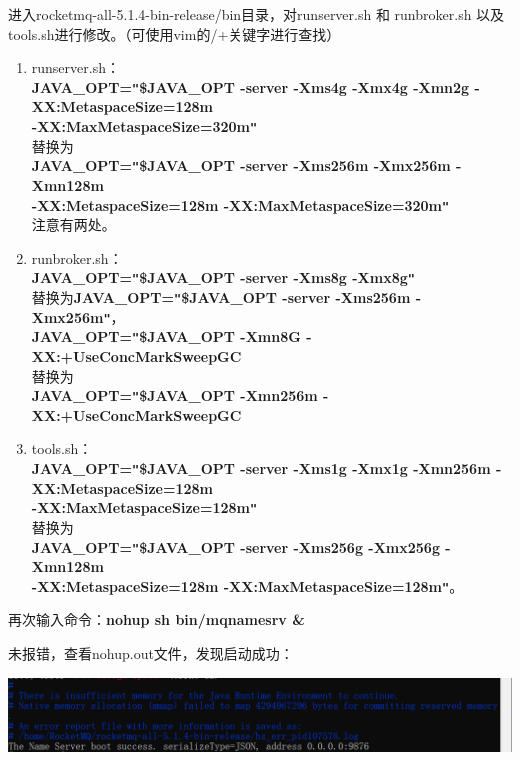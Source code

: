\documentclass[11pt, a4paper, oneside]{ctexbook}
\let\kaishu\relax                               %
\begin{document}
进入rocketmq-all-5.1.4-bin-release/bin目录，对runserver.sh 和 runbroker.sh 以及 tools.sh进行修改。（可使用vim的/+关键字进行查找）
\begin{enumerate}
  \item runserver.sh：
  \\{\bfseries\kaishu JAVA\_OPT=\texttt{"}\${JAVA\_OPT} -server -Xms4g -Xmx4g -Xmn2g -XX:MetaspaceSize=128m 
  \\-XX:MaxMetaspaceSize=320m\texttt{"}}
  \\替换为
  \\{\bfseries\kaishu JAVA\_OPT=\texttt{"}\${JAVA\_OPT} -server -Xms256m -Xmx256m -Xmn128m 
  \\-XX:MetaspaceSize=128m -XX:MaxMetaspaceSize=320m\texttt{"}}
  \\注意有两处。
  \item runbroker.sh：
  \\{\bfseries\kaishu JAVA\_OPT=\texttt{"}\${JAVA\_OPT} -server -Xms8g -Xmx8g\texttt{"}}
  \\替换为{\bfseries\kaishu JAVA\_OPT=\texttt{"}\${JAVA\_OPT} -server -Xms256m -Xmx256m\texttt{"}}，
  \\{\bfseries\kaishu JAVA\_OPT=\texttt{"}\${JAVA\_OPT} -Xmn8G -XX:+UseConcMarkSweepGC }
  \\替换为
  \\{\bfseries\kaishu JAVA\_OPT=\texttt{"}\${JAVA\_OPT} -Xmn256m -XX:+UseConcMarkSweepGC }
  \item tools.sh：
  \\{\bfseries\kaishu JAVA\_OPT=\texttt{"}\${JAVA\_OPT} -server -Xms1g -Xmx1g -Xmn256m -XX:MetaspaceSize=128m 
  \\-XX:MaxMetaspaceSize=128m\texttt{"}}
  \\替换为
  \\{\bfseries\kaishu JAVA\_OPT=\texttt{"}\${JAVA\_OPT} -server -Xms256g -Xmx256g -Xmn128m 
  \\-XX:MetaspaceSize=128m -XX:MaxMetaspaceSize=128m\texttt{"}}。
\end{enumerate}

再次输入命令：{\bfseries\kaishu nohup sh bin/mqnamesrv \&}

未报错，查看nohup.out文件，发现启动成功：
\begin{center}
  \begin{minipage}{\textwidth}
    \center
    \includegraphics[width=\textwidth]{picture/名称服务器启动成功.png}
    \captionsetup{hypcap=false}
    \label{fig:名称服务器启动成功}
  \end{minipage}
\end{center}
\end{document}
